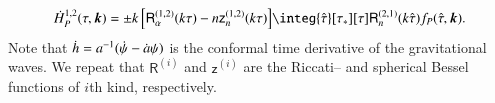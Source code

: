     \begin{equation}\label{eq:pertwalls:gws:Hdot_P_12}
        \dot{H}_P^{1,2}(\tau, \vec{k})  = \pm k \,\bclosed{ \mathsf{R}_\alpha^{(1,2)}(k\tau) -  n\mathsf{z}^{(1,2)}_n(k\tau) } \integ{\dummy{\tau}}[\tau_\ast][\tau] \mathsf{R}_n^{(2,1)}(k\dummy{\tau})  \Src_P(\dummy{\tau}, \vec{k}).
    \end{equation}
    Note that $\dot{h} = a^{-1} ( \dot{\psi} - \dot{a} \psi)$ is the conformal time derivative of the gravitational waves. 
    We repeat that $\mathsf{R}^{(i)}$ and $\mathsf{z}^{(i)}$ are the Riccati-- and spherical Bessel functions of $i$th kind, respectively.






